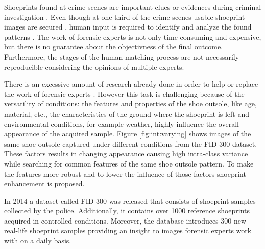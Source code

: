 \documentclass[draft,final]{vutinfth} %
\begin{document}
\par
Shoeprints found at crime scenes are important clues or evidences during criminal investigation \cite{kong2014novel}.
Even though at one third of the crime scenes usable shoeprint images are secured \cite{alexandre1996computerized}, human input is required to identify and analyze the found patterns  \cite{wang2014automatic}.
The work of forensic experts is not only time consuming and expensive, but there is no guarantee about the objectivness of the final outcome\cite{gueham2008automatic}.
Furthermore, the stages of the human matching process are not necessarily reproducible considering the opinions of multiple experts.
\par
There is an excessive amount of research already done in order to help or replace the work of forensic experts \cite{rida2019forensic}.
However this task is challenging because of the versatility of conditions: the features and properties of the shoe outsole, like age, material, etc., the characteristics of the ground where the shoeprint is left and environmental conditions, for example weather, highly influence the overall appearance of the acquired sample.
Figure \ref{fig:int:varying} shows images of the same shoe outsole captured under different conditions from the FID-300 \cite{kortylewski2014unsupervised} dataset.
These factors results in changing appearance causing high intra-class variance while searching for common features of the same shoe outsole pattern.
To make the features more robust and to lower the influence of those factors shoeprint enhancement is proposed.
\par
In 2014 a dataset called FID-300 \cite{kortylewski2014unsupervised} was released that consists of shoeprint samples collected by the police. 
Additionally, it contains over 1000 reference shoeprints acquired in controlled conditions.
Moreover, the database introduces 300 new real-life shoeprint samples providing an insight to images forensic experts work with on a daily basis.
\end{document}
